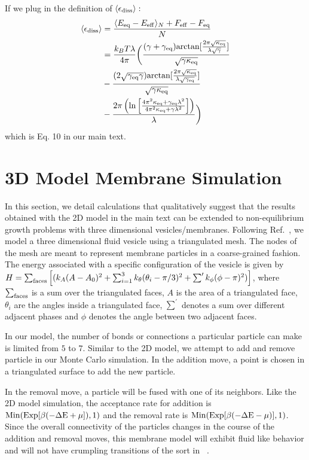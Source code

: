 \documentclass[amsmath,preprintnumbers,10pt,nofootinbib,prl,twocolumn]{revtex4-1}
\begin{document}
If we plug in the definition of $\langle\epsilon_{\rm diss}\rangle:$
\begin{equation}
    \begin{split}
        \langle\epsilon_{\rm diss}\rangle&=\frac{\langle E_{\rm{eq}}-E_{\rm{eff}}\rangle_N+F_{\rm{eff}}-F_{\rm{eq}}}{N}\\
        &=\frac{k_BT\lambda}{4\pi}\biggl( \frac{(\gamma+\gamma_{\rm eq})\rm{arctan}[\frac{2\pi\sqrt{\kappa_{\rm eq}}}{\lambda\sqrt{\gamma}}]}{\sqrt{\gamma\kappa_{\rm eq}}}\\
        &- \frac{(2\sqrt{\gamma_{\rm eq}\gamma})\rm{arctan}[\frac{2\pi\sqrt{\kappa_{\rm eq}}}{\lambda\sqrt{\gamma_{\rm eq}}}]}{\sqrt{\gamma\kappa_{\rm eq}}} \\
        & -\frac{2\pi\left(\rm{ln}\left[\frac{4\pi^2\kappa_{\rm eq}+\gamma_{\rm eq}\lambda^2}{4\pi^2\kappa_{\rm eq}+\gamma\lambda^2}\right]\right)}{\lambda}\biggr)
    \end{split}
\end{equation}
which is Eq. 10 in our main text.
\section{3D Model Membrane Simulation}

In this section, we detail calculations that qualitatively suggest that the results obtained with the 2D model in the main text can be extended to non-equilibrium growth problems with three dimensional vesicles/membranes. Following Ref.~\cite{Mahadevan2019}, we model a three dimensional fluid vesicle using a triangulated mesh. The nodes of the mesh are meant to represent membrane particles in a coarse-grained fashion. The energy associated with a specific configuration of the vesicle is given by  $H=\sum_{\rm faces}\left[ (k_A(A-A_0)^2 +\sum_{i=1}^3 k_\theta (\theta_i-\pi/3)^2 + \sum^\prime k_\phi (\phi-\pi)^2)\right]$, where $\sum_{\rm faces}$ is a sum over the triangulated faces, $A$ is the area of a triangulated face, $\theta_i$ are the angles inside a triangulated face,  $\sum^\prime$ denotes a sum over different adjacent phases and $\phi$ denotes the angle between two adjacent faces. 

In our model, the number of bonds or connections a particular particle can make is limited from $5$ to $7$.  Similar to the 2D model, we attempt to add and remove particle in our Monte Carlo simulation. In the addition move, a point is chosen in a triangulated surface to add the new particle.  

 In the removal move, a particle will be fused with one of its neighbors. Like the 2D model simulation, the acceptance rate for addition is $\rm{Min}(\rm{Exp}[\beta(-\Delta E +\mu]),1)$ and the removal rate is $\rm{Min}(\rm{Exp}[\beta(-\Delta E -\mu)],1)$. Since the overall connectivity of the particles changes in the course of the addition and removal moves, this membrane model will exhibit fluid like behavior and will not have crumpling transitions of the sort in ~\cite{Paulose2012}.
\end{document}
